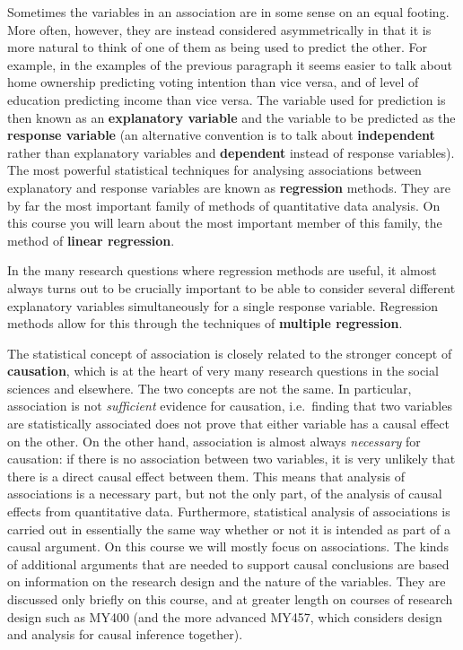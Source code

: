 Sometimes the variables in an association are in some sense on an equal
footing. More often, however, they are instead considered asymmetrically
in that it is more natural to think of one of them as being used to
predict the other. For example, in the examples of the previous
paragraph it seems easier to talk about home ownership predicting voting
intention than vice versa, and of level of education predicting income
than vice versa. The variable used for prediction is then known as an
\textbf{explanatory variable} and the variable to be predicted as the
\textbf{response variable} (an alternative convention is to talk about
\textbf{independent} rather than explanatory variables and
\textbf{dependent} instead of response variables). The most powerful
statistical techniques for analysing associations between explanatory
and response variables are known as \textbf{regression} methods. They
are by far the most important family of methods of quantitative data
analysis. On this course you will learn about the most important member
of this family, the method of \textbf{linear regression}.

In the many research questions where regression methods are useful, it
almost always turns out to be crucially important to be able to consider
several different explanatory variables simultaneously for a single
response variable. Regression methods allow for this
through the techniques of \textbf{multiple regression}.

The statistical concept of association is closely related to the
stronger concept of \textbf{causation}, which is at the heart of very
many research questions in the social sciences and elsewhere. The two
concepts are not the same. In particular, association is not
\emph{sufficient} evidence for causation, i.e.\ finding that two
variables are statistically associated does not prove that either
variable has a causal effect on the other. On the other hand,
association is almost always \emph{necessary} for causation: if
there is no association between two variables, it is very unlikely that
there is a direct causal effect between them. This means that analysis
of associations is a necessary part, but not the only part, of the
analysis of causal effects from quantitative data. Furthermore,
statistical analysis of associations is carried out in essentially the
same way whether or not it is intended as part of a causal argument. On
this course we will mostly focus on associations. The kinds of additional
arguments that are needed to support causal conclusions are based on
information on the
research design and the nature of the variables. They are discussed only
briefly on this course, and at greater length on courses of research design such as
MY400 (and the more advanced MY457, which considers design and analysis
for causal inference together).


